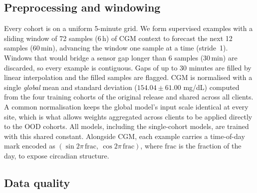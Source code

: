\documentclass[10pt,letterpaper]{article}
\begin{document}
\subsection*{Preprocessing and windowing}

Every cohort is on a uniform 5-minute grid. We form supervised examples with a
sliding window of 72 samples (6\,h) of CGM context to forecast the next 12
samples (60\,min), advancing the window one sample at a time (stride~1).
Windows that would bridge a sensor gap longer than 6 samples (30\,min) are
discarded, so every example is contiguous. Gaps of up to 30 minutes are
filled by linear interpolation and the filled samples are flagged. CGM is
normalised with a single \emph{global} mean and standard deviation
($154.04 \pm 61.00$ mg/dL) computed from the four training cohorts of the
original release and shared across all clients. A common normalisation keeps
the global model's input scale identical at every site, which is what allows
weights aggregated across clients to be applied directly to the OOD cohorts.
All models, including the single-cohort models, are trained with this shared
constant.
Alongside CGM, each example carries a time-of-day mark encoded as
$(\sin 2\pi\,\mathrm{frac},\ \cos 2\pi\,\mathrm{frac})$, where $\mathrm{frac}$
is the fraction of the day, to expose circadian structure.

\subsection*{Data quality}
\end{document}
